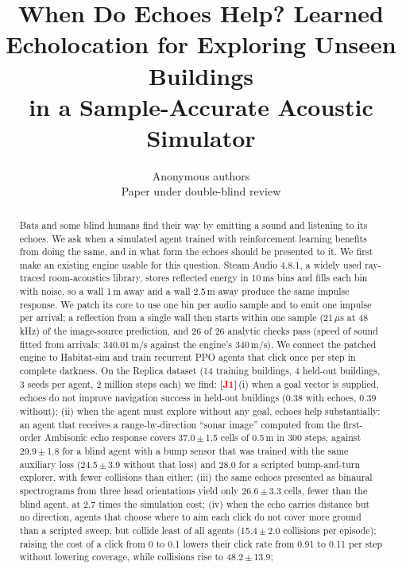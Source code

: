 \documentclass[10pt]{article}
\title{When Do Echoes Help? Learned Echolocation for Exploring Unseen Buildings\\ in a Sample-Accurate Acoustic Simulator}
\author{\name Anonymous authors \\ \addr Paper under double-blind review}
\newcommand{\cell}{0.5\,m}
\newif\ifreview \ifdefined\REVIEWMODE \reviewtrue \fi
\newcommand{\J}[1]{\ifreview\textcolor{red}{\textbf{[J#1]}}\,\fi}   %
\newcommand{\pmsd}[2]{#1\,{\scriptsize$\pm$\,#2}}
\begin{document}
\maketitle
{\renewcommand{\thefootnote}{}}

\begin{abstract}
Bats and some blind humans find their way by emitting a sound and listening to its echoes. We ask when a simulated agent trained with reinforcement learning benefits from doing the same, and in what form the echoes should be presented to it.
We first make an existing engine usable for this question. Steam Audio 4.8.1, a widely used ray-traced room-acoustics library, stores reflected energy in 10\,ms bins and fills each bin with noise, so a wall 1\,m away and a wall 2.5\,m away produce the same impulse response. We patch its core to use one bin per audio sample and to emit one impulse per arrival; a reflection from a single wall then starts within one sample (21\,$\mu$s at 48\,kHz) of the image-source prediction, and 26 of 26 analytic checks pass (speed of sound fitted from arrivals: 340.01\,m/s against the engine's 340\,m/s).
We connect the patched engine to Habitat-sim and train recurrent PPO agents that click once per step in complete darkness. On the Replica dataset (14 training buildings, 4 held-out buildings, 3 seeds per agent, 2 million steps each) we find:
\J{1}(i) when a goal vector is supplied, echoes do not improve navigation success in held-out buildings (0.38 with echoes, 0.39 without);
(ii) when the agent must explore without any goal, echoes help substantially: an agent that receives a range-by-direction ``sonar image'' computed from the first-order Ambisonic echo response covers \pmsd{37.0}{1.5} cells of \cell{} in 300 steps, against \pmsd{29.9}{1.8} for a blind agent with a bump sensor that was trained with the same auxiliary loss (\pmsd{24.5}{3.9} without that loss) and 28.0 for a scripted bump-and-turn explorer, with fewer collisions than either;
(iii) the same echoes presented as binaural spectrograms from three head orientations yield only \pmsd{26.6}{3.3} cells, fewer than the blind agent, at 2.7 times the simulation cost;
(iv) when the echo carries distance but no direction, agents that choose where to aim each click do not cover more ground than a scripted sweep, but collide least of all agents (\pmsd{15.4}{2.0} collisions per episode); raising the cost of a click from 0 to 0.1 lowers their click rate from 0.91 to 0.11 per step without lowering coverage, while collisions rise to \pmsd{48.2}{13.9};

\end{abstract}
\end{document}

